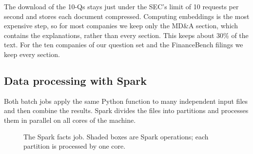 The download of the 10-Qs stays just under the SEC's limit of 10 requests per second and stores each
document compressed. Computing embeddings is the most expensive step, so for most companies we keep
only the MD\&A section, which contains the explanations, rather than every section. This keeps about
30\% of the text. For the ten companies of our question set and the FinanceBench filings we keep
every section.

\subsection{Data processing with Spark}
\label{sec:spark}

Both batch jobs apply the same Python function to many independent input files and then combine the
results. Spark divides the files into partitions and processes them in parallel on all cores of the
machine.

\begin{figure}[ht]
\centering
{}
\caption{The Spark facts job. Shaded boxes are Spark operations; each partition is processed by one
core.}
\label{fig:spark}
\end{figure}

